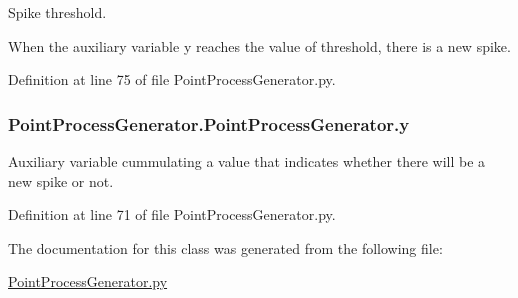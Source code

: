 Spike threshold. 

When the auxiliary variable y reaches the value of threshold, there is a new spike. 

Definition at line 75 of file Point\+Process\+Generator.\+py.

\subsubsection[{\texorpdfstring{y}{y}}]{\setlength{\rightskip}{0pt plus 5cm}Point\+Process\+Generator.\+Point\+Process\+Generator.\+y}\hypertarget{class_point_process_generator_1_1_point_process_generator_a70a43b5c26daf20833ecbc9f4d979726}{}\label{class_point_process_generator_1_1_point_process_generator_a70a43b5c26daf20833ecbc9f4d979726}


Auxiliary variable cummulating a value that indicates whether there will be a new spike or not. 



Definition at line 71 of file Point\+Process\+Generator.\+py.



The documentation for this class was generated from the following file\+:\begin{DoxyCompactItemize}
\item 
\hyperlink{_point_process_generator_8py}{Point\+Process\+Generator.\+py}\end{DoxyCompactItemize}
